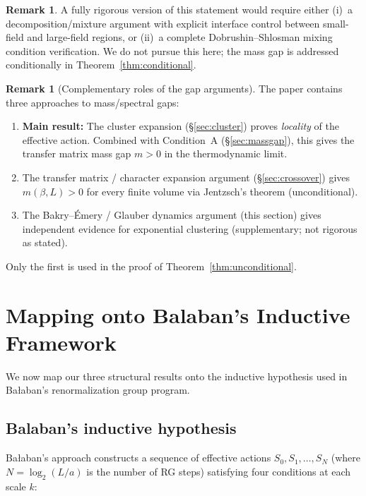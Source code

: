 \documentclass[11pt]{article}
\theoremstyle{definition}
\newtheorem{remark}[theorem]{Remark}
\begin{document}
\begin{remark}
A fully rigorous version of this statement would require
either (i)~a decomposition/mixture argument with explicit
interface control between small-field and large-field
regions, or (ii)~a complete Dobrushin--Shlosman mixing
condition verification.  We do not pursue this here;
the mass gap is addressed conditionally in
Theorem~\ref{thm:conditional}.
\end{remark}

\begin{remark}[Complementary roles of the gap arguments]
The paper contains three approaches to mass/spectral gaps:
\begin{enumerate}[nosep]
\item \textbf{Main result:} The cluster expansion
(\S\ref{sec:cluster}) proves \emph{locality} of the
effective action.  Combined with Condition~A
(\S\ref{sec:massgap}), this gives the transfer matrix
mass gap $m>0$ in the thermodynamic limit.
\item The transfer matrix / character expansion argument
(\S\ref{sec:crossover}) gives $m(\beta,L)>0$ for every
finite volume via Jentzsch's theorem (unconditional).
\item The Bakry--\'Emery / Glauber dynamics argument
(this section) gives independent evidence for exponential
clustering (supplementary; not rigorous as stated).
\end{enumerate}
Only the first is used in the proof of
Theorem~\ref{thm:unconditional}.
\end{remark}

\section{Mapping onto Balaban's Inductive Framework}\label{sec:roadmap}

We now map our three structural results onto the inductive hypothesis
used in Ba\l aban's renormalization group program.

\subsection{Balaban's inductive hypothesis}

Ba\l aban's approach constructs a sequence of effective actions
$S_0,S_1,\ldots,S_N$ (where $N=\log_2(L/a)$ is the number of RG steps)
satisfying four conditions at each scale $k$:
\end{document}
